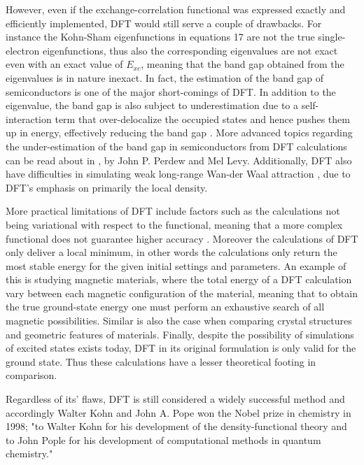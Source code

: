 However, even if the exchange-correlation functional was expressed exactly and efficiently implemented, DFT would still serve a couple of drawbacks. For instance the Kohn-Sham eigenfunctions in equations 17 are not the true single-electron eigenfunctions, thus also the corresponding eigenvalues are not exact even with an exact value of $E_{xc}$, meaning that the band gap obtained from the eigenvalues is in nature inexact. In fact, the estimation of the band gap of semiconductors is one of the major short-comings of DFT. In addition to the eigenvalue, the band gap is also subject to underestimation due to a self-interaction term that over-delocalize the occupied states and hence pushes them up in energy, effectively reducing the band gap \cite{dft_limitations}. More advanced topics regarding the under-estimation of the band gap in semiconductors from DFT calculations can be read about in \cite{dft_bandgap}, by John P. Perdew and Mel Levy. Additionally, DFT also have difficulties in simulating weak long-range Wan-der Waal attraction \cite{dft_wdv}, due to DFT's emphasis on primarily the local density.    

More practical limitations of DFT include factors such as the calculations not being variational with respect to the functional, meaning that a more complex functional does not guarantee higher accuracy \cite{dft_forum}. Moreover the calculations of DFT only deliver a local minimum, in other words the calculations only return the most stable energy for the given initial settings and parameters. An example of this is studying magnetic materials, where the total energy of a DFT calculation vary between each magnetic configuration of the material, meaning that to obtain the true ground-state energy one must perform an exhaustive search of all magnetic possibilities. Similar is also the case when comparing crystal structures and geometric features of materials. Finally, despite the possibility of simulations of excited states exists today, DFT in its original formulation is only valid for the ground state. Thus these calculations have a lesser theoretical footing in comparison.

Regardless of its' flaws, DFT is still considered a widely successful method and accordingly Walter Kohn and John A. Pope won the Nobel prize in chemistry in 1998; "to Walter Kohn for his development of the density-functional theory and to John Pople for his development of computational methods in quantum chemistry." \cite{nobelPrize}
